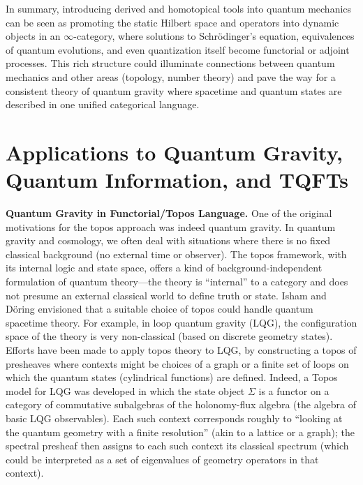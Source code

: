 \documentclass[12pt]{article}
\begin{document}
In summary, introducing derived and homotopical tools into quantum mechanics can be seen as promoting the static Hilbert space and operators into dynamic objects in an $\infty$-category, where solutions to Schrödinger’s equation, equivalences of quantum evolutions, and even quantization itself become functorial or adjoint processes. This rich structure could illuminate connections between quantum mechanics and other areas (topology, number theory) and pave the way for a consistent theory of quantum gravity where spacetime and quantum states are described in one unified categorical language.


\section{Applications to Quantum Gravity, Quantum Information, and TQFTs}

\textbf{Quantum Gravity in Functorial/Topos Language.} One of the original motivations for the topos approach was indeed quantum gravity. In quantum gravity and cosmology, we often deal with situations where there is no fixed classical background (no external time or observer). The topos framework, with its internal logic and state space, offers a kind of background-independent formulation of quantum theory---the theory is ``internal'' to a category and does not presume an external classical world to define truth or state. Isham and Döring envisioned that a suitable choice of topos could handle quantum spacetime theory. For example, in loop quantum gravity (LQG), the configuration space of the theory is very non-classical (based on discrete geometry states). Efforts have been made to apply topos theory to LQG, by constructing a topos of presheaves where contexts might be choices of a graph or a finite set of loops on which the quantum states (cylindrical functions) are defined. Indeed, a Topos model for LQG was developed in which the state object $\Sigma$ is a functor on a category of commutative subalgebras of the holonomy-flux algebra (the algebra of basic LQG observables). Each such context corresponds roughly to ``looking at the quantum geometry with a finite resolution'' (akin to a lattice or a graph); the spectral presheaf then assigns to each such context its classical spectrum (which could be interpreted as a set of eigenvalues of geometry operators in that context).
\end{document}
